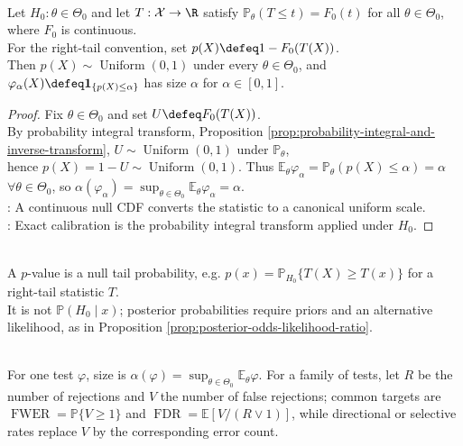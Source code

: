 \begin{proposition} \label{prop:continuous-null-p-value-uniform} \\
Let $H_0:\theta\in\Theta_0$ and let $T:\mathcal{X}\to\R$ satisfy $\mathbb{P}_\theta(T\leq t)=F_0(t)$ for all $\theta\in\Theta_0$, where $F_0$ is continuous.\\
For the right-tail convention, set $p(X)\defeq1-F_0(T(X))$.\\
Then $p(X)\sim\operatorname{Uniform}(0,1)$ under every $\theta\in\Theta_0$, and $\varphi_\alpha(X)\defeq\mathbf{1}_{\{p(X)\leq\alpha\}}$ has size $\alpha$ for $\alpha\in[0,1]$.
\begin{proof} Fix $\theta\in\Theta_0$ and set $U\defeq F_0(T(X))$.\\
By probability integral transform, Proposition \ref{prop:probability-integral-and-inverse-transform}, $U\sim\operatorname{Uniform}(0,1)$ under $\mathbb{P}_\theta$,\\
hence $p(X)=1-U\sim\operatorname{Uniform}(0,1)$. Thus $\mathbb{E}_\theta\varphi_\alpha=\mathbb{P}_\theta(p(X)\leq\alpha)=\alpha$ $\forall \theta\in\Theta_0$, so $\alpha(\varphi_\alpha)=\sup_{\theta\in\Theta_0}\mathbb{E}_\theta\varphi_\alpha=\alpha$.\\
: A continuous null CDF converts the statistic to a canonical uniform scale.\\
: Exact calibration is the probability integral transform applied under $H_0$.
\end{proof}
\end{proposition}

\begin{remark} \label{rem:p-values-are-not-posterior-probabilities} \\
A $p$-value is a null tail probability, e.g. $p(x)=\mathbb{P}_{H_0}\{T(X)\geq T(x)\}$ for a right-tail statistic $T$.\\
It is not $\mathbb{P}(H_0\mid x)$; posterior probabilities require priors and an alternative likelihood, as in Proposition \ref{prop:posterior-odds-likelihood-ratio}.
\end{remark}

\begin{remark} \label{rem:error-control-families} \\
For one test $\varphi$, size is $\alpha(\varphi)=\sup_{\theta\in\Theta_0}\mathbb{E}_\theta\varphi$.
For a family of tests, let $R$ be the number of rejections and $V$ the number of false rejections; common targets are $\operatorname{FWER}=\mathbb{P}\{V\geq1\}$ and $\operatorname{FDR}=\mathbb{E}[V/(R\vee1)]$, while directional or selective rates replace $V$ by the corresponding error count.
\end{remark}
